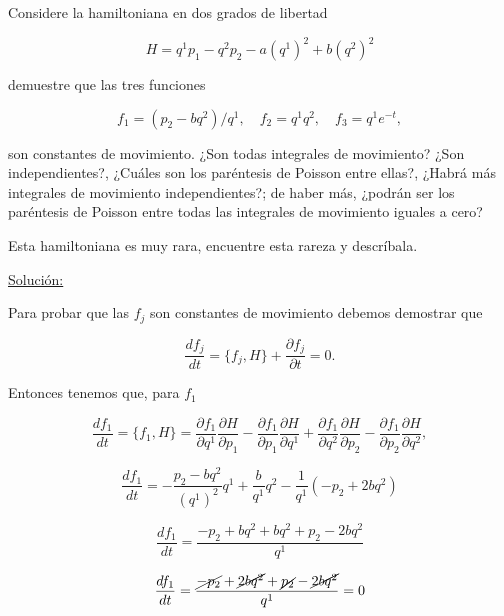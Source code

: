 \documentclass[a4paper,10pt]{article}
\numberwithin{equation}{section}
\begin{document}
Considere la hamiltoniana en dos grados de libertad 

$$
H = q^1p_1 - q^2p_2 - a(q^1)^2 + b(q^2)^2
$$

demuestre que las tres funciones 

$$
f_1 = (p_2 - bq^2)/q^1, \quad f_2 = q^1q^2, \quad f_3=q^1e^{-t},
$$

son constantes de movimiento. ¿Son todas integrales de movimiento? ¿Son independientes?, 
¿Cuáles son los paréntesis de Poisson entre ellas?, ¿Habrá más integrales de movimiento 
independientes?; de haber más, ¿podrán ser los paréntesis de Poisson entre todas 
las integrales de movimiento iguales a cero?

\vspace{.3cm}

Esta hamiltoniana es muy rara, encuentre esta rareza y descríbala.

\vspace{.3cm}

\underline{Solución:} \vspace{.3cm}

Para probar que las $f_j$ son constantes de movimiento debemos demostrar que 

\begin{equation}
 \frac{df_j}{dt} = \{f_j,H\} + \frac{\partial f_j}{\partial t} =  0.
\end{equation}

Entonces tenemos que, para $f_1$

\begin{equation}
 \frac{df_1}{dt} = \{f_1,H\} = \frac{\partial f_1}{\partial q^1}\frac{\partial H}{\partial p_1} - 
 \frac{\partial f_1}{\partial p_1}\frac{\partial H}{\partial q^1} +  \frac{\partial f_1}{\partial q^2}\frac{\partial H}{\partial p_2} - 
 \frac{\partial f_1}{\partial p_2}\frac{\partial H}{\partial q^2},
\end{equation}

\begin{equation}
 \frac{df_1}{dt} = - \frac{p_2 - bq^2}{(q^1)^2}q^1 + \frac{b}{q^1}q^2
 - \frac{1}{q^1}(-p_2 + 2bq^2)
\end{equation}

\begin{equation}
 \frac{df_1}{dt} = \frac{-p_2 + bq^2 + bq^2 + p_2 -2bq^2}{q^1} 
\end{equation}

\begin{equation}
 \frac{df_1}{dt} = \frac{\cancel{-p_2} + \cancel{2bq^2} + \cancel{p_2} - \cancel{2bq^2}}{q^1} = 0
\end{equation}
\end{document}
